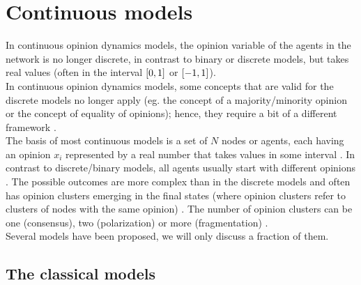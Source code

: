 \documentclass[11 pt , letterpaper , twoside , openright]{book}
\begin{document}
\section{Continuous models}\label{Con}

In continuous opinion dynamics models, the opinion variable of the agents in the network is no longer discrete, in contrast to binary or discrete models, but takes real values (often in the interval $\interval{0}{1}$ or $\interval{-1}{1}$).\\
In continuous opinion dynamics models, some concepts that are valid for the discrete models no longer apply (eg. the concept of a majority/minority opinion or the concept of equality of opinions); hence, they require a bit of a different framework \cite{Castellano2009}. \\
The basis of most continuous models is a set of $N$ nodes or agents, each having an opinion $x_i$ represented by a real number that takes values in some interval \cite{Castellano2009}. In contrast to discrete/binary models, all agents usually start with  different opinions \cite{Castellano2009}. The possible outcomes are more complex than in the discrete models and often has opinion clusters emerging in the final states (where opinion clusters refer to clusters of nodes with the same opinion) \cite{Castellano2009}. The number of opinion clusters can be one (consensus), two (polarization) or more (fragmentation) \cite{Castellano2009}. \\
Several models have been proposed, we will only discuss a fraction of them.

\subsection{The classical models}
\end{document}
